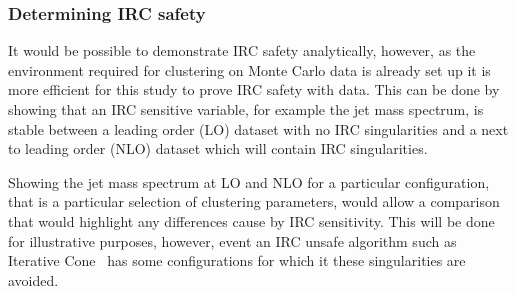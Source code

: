 
\subsubsection{Determining IRC safety}\label{sec:IRCmethod}
    It would be possible to demonstrate IRC safety analytically, however,
    as the environment required for clustering on Monte Carlo data is already set up
    it is more efficient for this study to prove IRC safety with data.
    This can be done by showing that an IRC sensitive variable, for example the jet mass spectrum,
    is stable between a leading order (LO) dataset with no IRC singularities and a next to leading order (NLO)
    dataset which will contain IRC singularities.

    Showing the jet mass spectrum at LO and NLO for a particular configuration,
    that is a particular selection of clustering parameters,
    would allow a comparison that would highlight any differences cause by IRC sensitivity.
    This will be done for illustrative purposes,
    however, event an IRC unsafe algorithm such as Iterative Cone~\cite{cacciari_antikt2018}
     has some configurations for which it these singularities are avoided.

